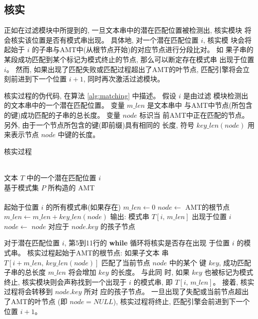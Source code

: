\subsection{核实}
\label{subsec:matching}

正如在过滤模块中所提到的, 一旦文本串中的潜在匹配位置被检测出, 核实模块
将会核实该位置是否有模式串出现。 具体地, 对一个潜在匹配位置 $i$, 核实模
块会将起始于 $i$ 的子串与AMT中(从根节点开始)的对应节点进行分段比对。 如
果子串的某段成功匹配到某个标记为模式终止的节点, 那么可以断定存在模式串
出现于位置 $i$。 然而, 如果出现了匹配失败或匹配过程超出了AMT的叶节点,
匹配引擎将会立刻前进到下一个位置 $i+1$, 同时再次激活过滤模块。

核实过程的伪代码, 在算法 \ref{alg:matching} 中描述。 假设 $i$ 是由过滤
模块检测出的文本串中的一个潜在匹配位置。 变量 $m\_len$ 是文本串中
与AMT中节点(所包含的键)成功匹配的子串的总长度。 变量 $node$ 标识当
前AMT中正在匹配的节点。 另外, 由于一个节点所包含的键(即前缀)具有相同的
长度, 符号 $key\_len(node)$ 用来表示节点 $node$ 中键的长度。

\begin{algorithm}
  \caption{核实过程}
  \label{alg:matching}
  \begin{algorithmic}[1]
    \REQUIRE ~~\\
    文本 $T$ 中的一个潜在匹配位置 $i$ \\
    基于模式集 $P$ 所构造的 AMT\\
    \ENSURE ~~\\
    起始于位置 $i$ 的所有模式串(如果存在)
    \STATE
    \STATE $m\_len \leftarrow 0$
    \STATE $node \leftarrow $ AMT的根节点
    \STATE
    \STATE $m\_len \leftarrow m\_len + key\_len(node)$
    \STATE 输出: 模式串 $T[i,\,m\_len]$ 出现于位置 $i$
    \ENDIF
    \STATE $node \leftarrow$  $node$ 对应于 $node.key$ 的孩子节点
    \ENDWHILE
  \end{algorithmic}
\end{algorithm}

对于潜在匹配位置 $i$, 第5到11行的 \textbf{while} 循环将核实是否存在出现
于位置 $i$ 的模式串。 核实过程起始于AMT的根节点: 如果子文本
串 $T[i+m\_len, \, key\_len(node)]$ 匹配了当前节点 $node$ 中的某个
键 $key$, 成功匹配子串的总长度 $m\_len$ 将会增加 $key$ 的长度。 与此同
时, 如果 $key$ 也被标记为模式终止, 核实模块则会声称找到一个出现于 $i$
的模式串, 即 $T[i,\,m\_len]$。 接着, 核实过程将会转移到 $node.key$ 所对
应的孩子节点。 一旦出现了失配或当前节点超出了AMT的叶节点 (即 $node =
NULL$), 核实过程将终止, 匹配引擎会前进到下一个位置 $i+1$。

